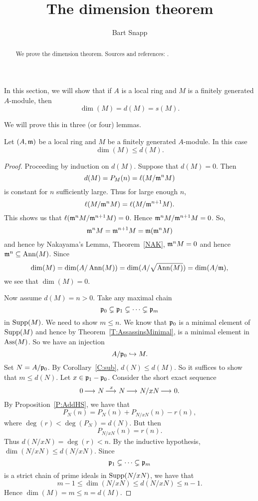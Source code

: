 \documentclass{ximera}
\author{Bart Snapp}
\title{The dimension theorem}
\begin{document}
\begin{abstract}
  We prove the dimension theorem. Sources and
  references: \cite{sD2008,hM1986}.
\end{abstract}
\maketitle


In this section, we will show that if $A$ is a local ring and $M$ is a
finitely generated $A$-module, then
\[
\dim(M) = d(M) = s(M). 
\]

We will prove this in three (or four) lemmas.

\begin{lemma}\label{L:dimd}
  Let $(A,\mathfrak{m})$ be a local ring and $M$ be a finitely generated
  $A$-module. In this case
  \[
  \dim(M)\le d(M).
  \]
  \begin{proof}
    Proceeding by induction on $d(M)$. Suppose that $d(M) = 0$. Then 
    \[
    d(M) = P_M(n) = \ell(M/\mathfrak{m}^n M)
    \]
    is constant for $n$ sufficiently large. Thus for large enough $n$,
    \[
    \ell(M/\mathfrak{m}^n M) = \ell(M/\mathfrak{m}^{n+1}M).
    \]
    This shows us that $\ell(\mathfrak{m}^n M/\mathfrak{m}^{n+1}M) = 0$. Hence $\mathfrak{m}^n
    M/\mathfrak{m}^{n+1}M = 0$. So,
    \[
    \mathfrak{m}^n M = \mathfrak{m}^{n+1}M = \mathfrak{m}(\mathfrak{m}^n M)
    \]
    and hence by Nakayama's Lemma,
    Theorem~\ref{NAK}, $\mathfrak{m}^n M =0$ and hence
    $\mathfrak{m}^n\subseteq\operatorname{Ann}(M)$. Since
    \[
    \dim(M) = \dim(A/\operatorname{Ann}(M))  = \dim(A/\sqrt{\operatorname{Ann}(M)}) = \dim(A/\mathfrak{m}),
    \]   
    we see that $\dim(M) = 0$. 
    
    Now assume $d(M) = n> 0$. Take any maximal chain 
    \[
    \mathfrak{p}_0\subsetneq \mathfrak{p}_1 \subsetneq \cdots \subsetneq \mathfrak{p}_m
    \]
    in $\operatorname{Supp}(M)$.  We need to show $m\le n$. We know that $\mathfrak{p}_0$ is a
    minimal element of $\operatorname{Supp}(M)$ and hence by
    Theorem~\ref{T:AssassinsMinimal}, is a minimal element in
    $\operatorname{Ass}(M)$.  So we have an injection
    \[
    A/\mathfrak{p}_0\hookrightarrow M.
    \]
    Set $N = A/\mathfrak{p}_0$.  By Corollary~\ref{C:sub}, $d(N) \le d(M)$.  So
    it suffices to show that $m \le d(N)$.  Let $x \in \mathfrak{p}_1 - \mathfrak{p}_0$.
    Consider the short exact sequence
    \[
    0\mathop{\longrightarrow\,}\limits N \mathop{\longrightarrow\,}\limits^{x} N \mathop{\longrightarrow\,}\limits N/xN \mathop{\longrightarrow\,}\limits 0.
    \]
    By Proposition~\ref{P:AddHS}, we have that
    \[
    P_N(n) = P_N(n) + P_{N/xN}(n) - r(n),
    \]
    where $\deg(r) < \deg(P_N) = d(N)$.  But then
    \[
    P_{N/xN}(n) = r(n).
    \]
    Thus $d(N/xN) = \deg(r) < n$.  By the inductive hypothesis,
    $\dim(N/xN) \le d(N/xN)$.  Since
    \[
    \mathfrak{p}_1 \subsetneq \cdots \subsetneq \mathfrak{p}_m
    \]
    is a strict chain of prime ideals in $\operatorname{Supp}(N/xN)$, we have that
    \[
    m - 1 \le \dim(N/xN) \le d(N/xN) \le n - 1.
    \]
    Hence $\dim(M) = m \le n = d(M)$.
  \end{proof}
\end{lemma}
\end{document}
